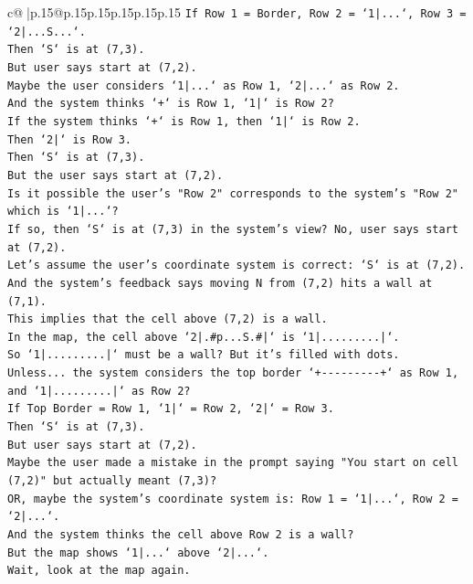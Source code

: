 \documentclass{article}
\begin{document}
{\begin{supertabular}{c@{$\;$}|p{.15\linewidth}@{}p{.15\linewidth}p{.15\linewidth}p{.15\linewidth}p{.15\linewidth}p{.15\linewidth}}
{{{\texttt{If Row 1 = Border, Row 2 = `1|...`, Row 3 = `2|...S...`.} \\
\texttt{Then `S` is at (7,3).} \\
\texttt{But user says start at (7,2).} \\
\texttt{Maybe the user considers `1|...` as Row 1, `2|...` as Row 2.} \\
\texttt{And the system thinks `+` is Row 1, `1|` is Row 2?} \\
\texttt{If the system thinks `+` is Row 1, then `1|` is Row 2.} \\
\texttt{Then `2|` is Row 3.} \\
\texttt{Then `S` is at (7,3).} \\
\texttt{But the user says start at (7,2).} \\
\texttt{Is it possible the user's "Row 2" corresponds to the system's "Row 2" which is `1|...`?} \\
\texttt{If so, then `S` is at (7,3) in the system's view? No, user says start at (7,2).} \\
\texttt{Let's assume the user's coordinate system is correct: `S` is at (7,2).} \\
\texttt{And the system's feedback says moving N from (7,2) hits a wall at (7,1).} \\
\texttt{This implies that the cell above (7,2) is a wall.} \\
\texttt{In the map, the cell above `2|.\#p...S.\#|` is `1|.........|`.} \\
\texttt{So `1|.........|` must be a wall? But it's filled with dots.} \\
\texttt{Unless... the system considers the top border `+{-}{-}{-}{-}{-}{-}{-}{-}{-}+` as Row 1, and `1|.........|` as Row 2?} \\
\texttt{If Top Border = Row 1, `1|` = Row 2, `2|` = Row 3.} \\
\texttt{Then `S` is at (7,3).} \\
\texttt{But user says start at (7,2).} \\
\texttt{Maybe the user made a mistake in the prompt saying "You start on cell (7,2)" but actually meant (7,3)?} \\
\texttt{OR, maybe the system's coordinate system is: Row 1 = `1|...`, Row 2 = `2|...`.} \\
\texttt{And the system thinks the cell above Row 2 is a wall?} \\
\texttt{But the map shows `1|...` above `2|...`.} \\
\texttt{Wait, look at the map again.} \\
}}}
\end{supertabular}}
\end{document}
